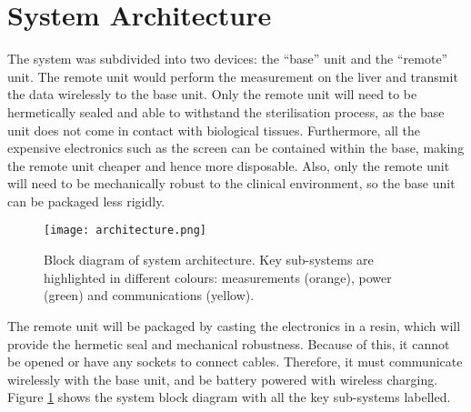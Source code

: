 \section{System Architecture}

The system was subdivided into two devices: the ``base'' unit and the ``remote'' unit. The remote unit would perform the measurement on the liver and transmit the data wirelessly to the base unit. Only the remote unit will need to be hermetically sealed and able to withstand the sterilisation process, as the base unit does not come in contact with biological tissues. Furthermore, all the expensive electronics such as the screen can be contained within the base, making the remote unit cheaper and hence more disposable. Also, only the remote unit will need to be mechanically robust to the clinical environment, so the base unit can be packaged less rigidly. 



\begin{figure}[htbp]
	\centering
	\texttt{[image: architecture.png]}
	\caption{Block diagram of system architecture. Key sub-systems are highlighted in different colours: measurements (orange), power (green) and communications (yellow).}
	\label{fig: architecture}
\end{figure}

The remote unit will be packaged by casting the electronics in a resin, which will provide the hermetic seal and mechanical robustness. Because of this, it cannot be opened or have any sockets to connect cables. Therefore, it must communicate wirelessly with the base unit, and be battery powered with wireless charging. Figure \ref{fig: architecture} shows the system block diagram with all the key sub-systems labelled.